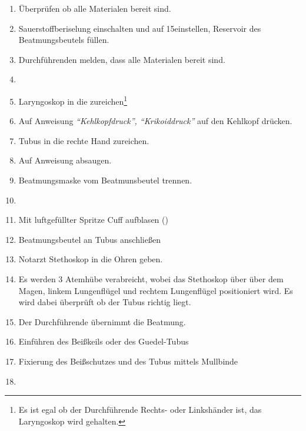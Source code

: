 \begin{enumerate}
    \item Überprüfen ob alle Materialen bereit sind.
    \item Sauerstoffberiselung einschalten und auf 15\LMin einstellen,
    Reservoir des Beatmungsbeutels füllen. 
    \item Durchführenden melden, dass alle Materialen bereit sind.
    \item {}
    \item Laryngoskop in die  zureichen\footnote{Es ist egal ob
    der Durchführende Rechts- oder Linkshänder ist, das Laryngoskop wird
     gehalten.}
    \item Auf Anweisung \emph{"`Kehlkopfdruck"', "`Krikoiddruck"'} auf den
    Kehlkopf drücken.
    \item Tubus in die rechte Hand zureichen.
    \item Auf Anweisung absaugen.
    \item Beatmungsmaske vom Beatmunsbeutel trennen.
    \item {}
    \item Mit luftgefüllter Spritze Cuff aufblasen ()
    \item Beatmungsbeutel an Tubus anschließen
    \item Notarzt Stethoskop in die Ohren geben. 
    \item Es werden 3 Atemhübe verabreicht, wobei das
    Stethoskop über über dem Magen, linkem Lungenflügel und
    rechtem Lungenflügel positioniert wird. Es wird dabei überprüft ob der Tubus richtig liegt. 
    \item Der Durchführende übernimmt die Beatmung. 
    \item Einführen des Beißkeils oder des Guedel-Tubus
    \item Fixierung des Beißschutzes und des Tubus mittels Mullbinde
    \item {}
\end{enumerate}

\TakeNotesMedium



